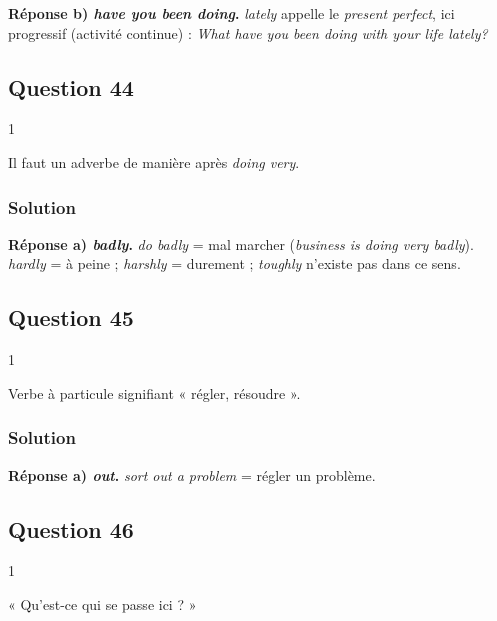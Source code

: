 \documentclass[11pt,a4paper]{article}
\begin{document}
\textbf{Réponse b) \emph{have you been doing}.} \emph{lately} appelle le \emph{present perfect}, ici progressif (activité continue) : \emph{What have you been doing with your life lately?}

\hypertarget{question-44}{%
\subsection{Question 44}\label{question-44}}

\begin{indication}{1}

Il faut un adverbe de manière après \emph{doing very}.

\end{indication}

\hypertarget{solution-43}{%
\subsubsection{Solution}\label{solution-43}}

\textbf{Réponse a) \emph{badly}.} \emph{do badly} = mal marcher (\emph{business is doing very badly}). \emph{hardly} = à peine ; \emph{harshly} = durement ; \emph{toughly} n'existe pas dans ce sens.

\hypertarget{question-45}{%
\subsection{Question 45}\label{question-45}}

\begin{indication}{1}

Verbe à particule signifiant « régler, résoudre ».

\end{indication}

\hypertarget{solution-44}{%
\subsubsection{Solution}\label{solution-44}}

\textbf{Réponse a) \emph{out}.} \emph{sort out a problem} = régler un problème.

\hypertarget{question-46}{%
\subsection{Question 46}\label{question-46}}

\begin{indication}{1}

« Qu'est-ce qui se passe ici ? »

\end{indication}
\end{document}
